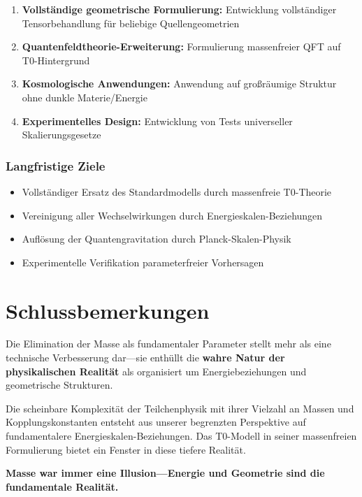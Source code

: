 \documentclass[12pt,a4paper]{article}
\begin{document}
	\begin{enumerate}
		\item \textbf{Vollständige geometrische Formulierung:} Entwicklung vollständiger Tensorbehandlung für beliebige Quellengeometrien
		\item \textbf{Quantenfeldtheorie-Erweiterung:} Formulierung massenfreier QFT auf T0-Hintergrund
		\item \textbf{Kosmologische Anwendungen:} Anwendung auf großräumige Struktur ohne dunkle Materie/Energie
		\item \textbf{Experimentelles Design:} Entwicklung von Tests universeller Skalierungsgesetze
	\end{enumerate}
	
	\subsubsection{Langfristige Ziele}
	
	\begin{itemize}
		\item Vollständiger Ersatz des Standardmodells durch massenfreie T0-Theorie
		\item Vereinigung aller Wechselwirkungen durch Energieskalen-Beziehungen
		\item Auflösung der Quantengravitation durch Planck-Skalen-Physik
		\item Experimentelle Verifikation parameterfreier Vorhersagen
	\end{itemize}
	
	\section{Schlussbemerkungen}
	\label{sec:final_remarks}
	
	Die Elimination der Masse als fundamentaler Parameter stellt mehr als eine technische Verbesserung dar—sie enthüllt die \textbf{wahre Natur der physikalischen Realität} als organisiert um Energiebeziehungen und geometrische Strukturen. 
	
	Die scheinbare Komplexität der Teilchenphysik mit ihrer Vielzahl an Massen und Kopplungskonstanten entsteht aus unserer begrenzten Perspektive auf fundamentalere Energieskalen-Beziehungen. Das T0-Modell in seiner massenfreien Formulierung bietet ein Fenster in diese tiefere Realität.
	
	\textbf{Masse war immer eine Illusion—Energie und Geometrie sind die fundamentale Realität.}
	
\end{document}
